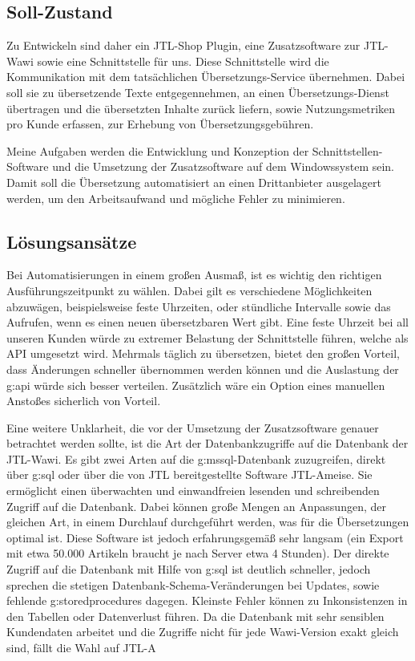 \subsection{Soll-Zustand}
\label{sec:soll}
Zu Entwickeln sind daher ein JTL-Shop Plugin, eine Zusatzsoftware zur JTL-Wawi sowie eine Schnittstelle für uns. 
Diese Schnittstelle wird die Kommunikation mit dem tatsächlichen Übersetzungs-Service übernehmen.
Dabei soll sie zu übersetzende Texte entgegennehmen, an einen Übersetzungs-Dienst übertragen und die übersetzten Inhalte zurück liefern, sowie Nutzungsmetriken pro Kunde erfassen, zur Erhebung von Übersetzungsgebühren.

Meine Aufgaben werden die Entwicklung und Konzeption der Schnittstellen-Software und die Umsetzung der Zusatzsoftware auf dem Windowssystem sein.
Damit soll die Übersetzung automatisiert an einen Drittanbieter ausgelagert werden, um den Arbeitsaufwand und mögliche Fehler zu minimieren.

\subsection{Lösungsansätze}
\label{sec:solutions}
Bei Automatisierungen in einem großen Ausmaß, ist es wichtig den richtigen Ausführungszeitpunkt zu wählen. 
Dabei gilt es verschiedene Möglichkeiten abzuwägen, beispielsweise feste Uhrzeiten, oder stündliche Intervalle sowie das Aufrufen, wenn es einen neuen übersetzbaren Wert gibt. 
Eine feste Uhrzeit bei all unseren Kunden würde zu extremer Belastung der Schnittstelle führen, welche als API umgesetzt wird.
Mehrmals täglich zu übersetzen, bietet den großen Vorteil, dass Änderungen schneller übernommen werden können und die Auslastung der \gls{g:api} würde sich besser verteilen. 
Zusätzlich wäre ein Option eines manuellen Anstoßes sicherlich von Vorteil.

Eine weitere Unklarheit, die vor der Umsetzung der Zusatzsoftware genauer betrachtet werden sollte, ist die Art der Datenbankzugriffe auf die Datenbank der JTL-Wawi.
Es gibt zwei Arten auf die \gls{g:mssql}-Datenbank zuzugreifen, direkt über \gls{g:sql} oder über die von JTL bereitgestellte Software JTL-Ameise. 
Sie ermöglicht einen überwachten und einwandfreien lesenden und schreibenden Zugriff auf die Datenbank. 
Dabei können große Mengen an Anpassungen, der gleichen Art, in einem Durchlauf durchgeführt werden, was für die Übersetzungen optimal ist.
Diese Software ist jedoch erfahrungsgemäß sehr langsam (ein Export mit etwa 50.000 Artikeln braucht je nach Server etwa 4 Stunden).
Der direkte Zugriff auf die Datenbank mit Hilfe von \gls{g:sql} ist deutlich schneller, 
jedoch sprechen die stetigen Datenbank-Schema-Veränderungen bei Updates, sowie fehlende \gls{g:storedprocedure}s dagegen.
Kleinste Fehler können zu Inkonsistenzen in den Tabellen oder Datenverlust führen.
Da die Datenbank mit sehr sensiblen Kundendaten arbeitet und die Zugriffe nicht für jede Wawi-Version exakt gleich sind, fällt die Wahl auf JTL-A

